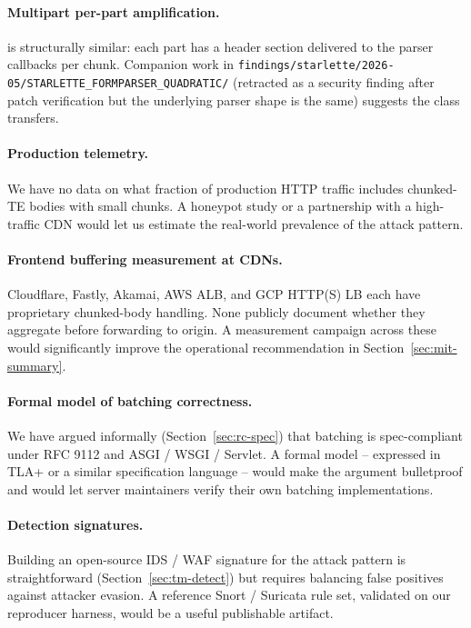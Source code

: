 \paragraph{Multipart per-part amplification.}
 is structurally similar: each part has
a header section delivered to the parser callbacks per chunk.
Companion work in
\texttt{findings/starlette/2026-05/STARLETTE\_FORMPARSER\_QUADRATIC/}
(retracted as a security finding after patch verification but the
underlying parser shape is the same) suggests the class transfers.

\paragraph{Production telemetry.}
We have no data on what fraction of production HTTP traffic
includes chunked-TE bodies with small chunks. A honeypot study or
a partnership with a high-traffic CDN would let us estimate the
real-world prevalence of the attack pattern.

\paragraph{Frontend buffering measurement at CDNs.}
Cloudflare, Fastly, Akamai, AWS ALB, and GCP HTTP(S) LB each have
proprietary chunked-body handling. None publicly document whether
they aggregate before forwarding to origin. A measurement campaign
across these would significantly improve the operational
recommendation in Section~\ref{sec:mit-summary}.

\paragraph{Formal model of batching correctness.}
We have argued informally (Section~\ref{sec:rc-spec}) that
batching is spec-compliant under RFC 9112 and ASGI / WSGI /
Servlet. A formal model -- expressed in TLA+ or a similar
specification language -- would make the argument bulletproof
and would let server maintainers verify their own batching
implementations.

\paragraph{Detection signatures.}
Building an open-source IDS / WAF signature for the attack
pattern is straightforward (Section~\ref{sec:tm-detect}) but
requires balancing false positives against attacker evasion.
A reference Snort / Suricata rule set, validated on our
reproducer harness, would be a useful publishable artifact.
